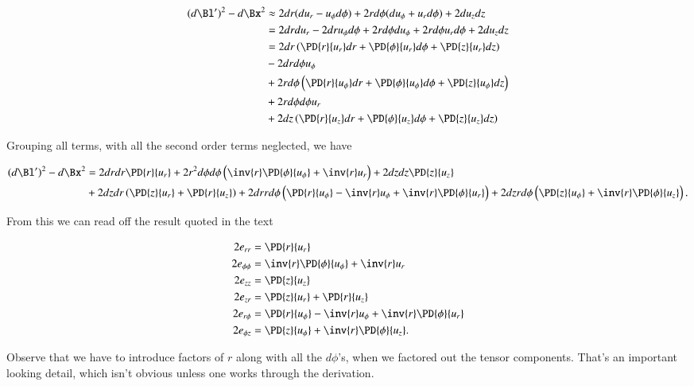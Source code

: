 \begin{align*}
(d\Bl')^2 - d\Bx^2
&\approx
  2 dr ( du_r - u_\phi d\phi )
+ 2 r d\phi ( du_\phi + u_r d\phi )
+ 2 du_z dz \\
&=
  2 dr du_r 
- 2 dr u_\phi d\phi 
+ 2 r d\phi du_\phi 
+ 2 r d\phi u_r d\phi 
+ 2 du_z dz 
\\
&=
  2 dr 
\left( 
\PD{r}{u_r} dr
+\PD{\phi}{u_r} d\phi
+\PD{z}{u_r} dz
\right) \\
&- 2 dr d\phi u_\phi  \\
&+ 2 r d\phi 
\left( 
\PD{r}{u_\phi} dr
+\PD{\phi}{u_\phi} d\phi
+\PD{z}{u_\phi} dz
\right) \\
&+ 2 r d\phi d\phi u_r \\
&+ 2 
dz 
\left( 
\PD{r}{u_z} dr
+\PD{\phi}{u_z} d\phi
+\PD{z}{u_z} dz
\right) \\
\end{align*}

Grouping all terms, with all the second order terms neglected, we have

\begin{equation}\label{eqn:continuumL2:450}
\begin{aligned}
(d\Bl')^2 - d\Bx^2
&=
2 dr dr \PD{r}{u_r} 
+ 2 r^2 d\phi d\phi \left( \inv{r} \PD{\phi}{u_\phi} +\inv{r} u_r \right)
+ 2 dz dz \PD{z}{u_z}  \\
&+ 2 dz dr \left( \PD{z}{u_r} + \PD{r}{u_z} \right)
+ 2 dr r d\phi \left( \PD{r}{u_\phi} - \inv{r} u_\phi + \inv{r} \PD{\phi}{u_r} \right)
+ 2 dz r d\phi \left( \PD{z}{u_\phi} +\inv{r} \PD{\phi}{u_z} \right).
\end{aligned}
\end{equation}

From this we can read off the result quoted in the text

\begin{align}\label{eqn:continuumL2:470}
2 e_{rr} &= \PD{r}{u_r}  \\
2 e_{\phi\phi} &= \inv{r} \PD{\phi}{u_\phi} +\inv{r} u_r  \\
2 e_{zz} &= \PD{z}{u_z}  \\
2 e_{zr} &= \PD{z}{u_r} + \PD{r}{u_z} \\
2 e_{r\phi} &= \PD{r}{u_\phi} - \inv{r} u_\phi + \inv{r} \PD{\phi}{u_r} \\
2 e_{\phi z} &= \PD{z}{u_\phi} +\inv{r} \PD{\phi}{u_z}.
\end{align}

Observe that we have to introduce factors of $r$ along with all the $d\phi$'s, when we factored out the tensor components.  That's an important looking detail, which isn't obvious unless one works through the derivation.

